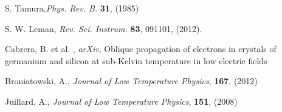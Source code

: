 \documentclass[final,3p,times,twocolumn]{elsarticle}
\begin{document}
\begin{thebibliography}{99}
S. Tamura,{\it Phys. Rev. B.} \textbf{31}, (1985)

S. W. Leman, {\it Rev. Sci. Instrum.} \textbf{83}, 091101, (2012).

Cabrera, B. et al. , {\it arXiv},  Oblique propagation of electrons in crystals of germanium and silicon at sub-Kelvin temperature in low electric fields

Broniatowski, A., {\it Journal of Low Temperature Physics}, \textbf{167}, (2012)

Juillard, A., {\it Journal of Low Temperature Physics}, \textbf{151}, (2008) 



\end{thebibliography}






\end{document}
